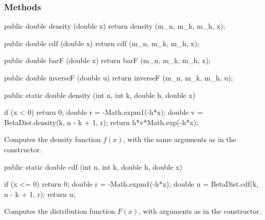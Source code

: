 \subsubsection* {Methods}

\begin{code}\begin{hide}
   public double density (double x) {
      return density (m_n, m_k, m_h, x);
   }

   public double cdf (double x) {
      return cdf (m_n, m_k, m_h, x);
   }

   public double barF (double x) {
      return barF (m_n, m_k, m_h, x);
   }

   public double inverseF (double u) {
      return inverseF (m_n, m_k, m_h, u);
   }\end{hide}

   public static double density (int n, int k, double h, double x)\begin{hide} {
      if (x < 0)
         return 0;
      double r = -Math.expm1(-h*x);
      double v = BetaDist.density(k, n - k + 1, r);
      return h*v*Math.exp(-h*x);
   }\end{hide}
\end{code}
  \begin{tabb} Computes the density function $f(x)$, with the same arguments
  as in the constructor.
\end{tabb}
\begin{htmlonly}
\end{htmlonly}
\begin{code}

   public static double cdf (int n, int k, double h, double x)\begin{hide} {
      if (x <= 0)
         return 0;
      double r = -Math.expm1(-h*x);
      double u = BetaDist.cdf(k, n - k + 1, r);
      return u;
   }\end{hide}
\end{code}
\begin{tabb} Computes the distribution function $F(x)$, with arguments
  as in the constructor.
 \end{tabb}
\begin{htmlonly}
\end{htmlonly}
